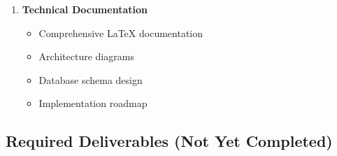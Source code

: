 \documentclass[12pt,a4paper]{article}
\begin{document}
\begin{enumerate}[leftmargin=*]
    \item \textcolor{implemented}{\textbf{Technical Documentation}}
    \begin{itemize}
        \item Comprehensive LaTeX documentation
        \item Architecture diagrams
        \item Database schema design
        \item Implementation roadmap
    \end{itemize}
\end{enumerate}

\subsection{Required Deliverables (Not Yet Completed)}
\end{document}
